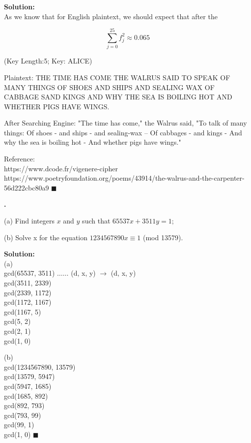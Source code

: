 \documentclass{article}
\newcounter{pcounter}                                   %
\newenvironment{problem}                                %
{                                                       %
    \stepcounter{pcounter}                              %
    \textbf{\arabic{pcounter}.}                         %
}{}                                                     %
\newenvironment{solution}                               %
{\textbf{Solution:} \\}{$\blacksquare$\newline}         %
\begin{document}
    \begin{solution}
        As we know that for English plaintext, we should expect that after the  
        
        $$
            \sum\limits_{j=0}^{25} f_{j}^2 \approx 0.065
        $$

        (Key Length:5; Key: ALICE)

        Plaintext: THE TIME HAS COME THE WALRUS SAID TO SPEAK OF MANY THINGS OF SHOES AND SHIPS AND SEALING WAX OF CABBAGE SAND KINGS AND WHY THE SEA IS BOILING HOT AND WHETHER PIGS HAVE WINGS.

        After Searching Engine: "The time has come," the Walrus said, "To talk of many things: Of shoes - and ships - and sealing-wax -- Of cabbages - and kings - And why the sea is boiling hot - And whether pigs have wings."

        Reference: \\
        https://www.dcode.fr/vigenere-cipher \\
        https://www.poetryfoundation.org/poems/43914/the-walrus-and-the-carpenter-56d222cbc80a9
    \end{solution}

    \begin{problem}
        (a) Find integers $x$ and $y$ such that $65537x+3511y=1$;
        
        (b) Solve x for the equation $1234567890x \equiv 1$ (mod 13579).
    \end{problem}
    
    \begin{solution}
        (a) \\
        gcd(65537, 3511) $\dots\dots$ (d, x, y) $\rightarrow$ (d, x, y)\\
        gcd(3511, 2339) \\
        gcd(2339, 1172) \\
        gcd(1172, 1167) \\
        gcd(1167, 5) \\
        gcd(5, 2) \\
        gcd(2, 1) \\
        gcd(1, 0)


        (b) \\
        gcd(1234567890, 13579) \\
        gcd(13579, 5947) \\
        gcd(5947, 1685) \\
        gcd(1685, 892) \\
        gcd(892, 793) \\
        gcd(793, 99) \\
        gcd(99, 1) \\
        gcd(1, 0)
    \end{solution}
\end{document}
